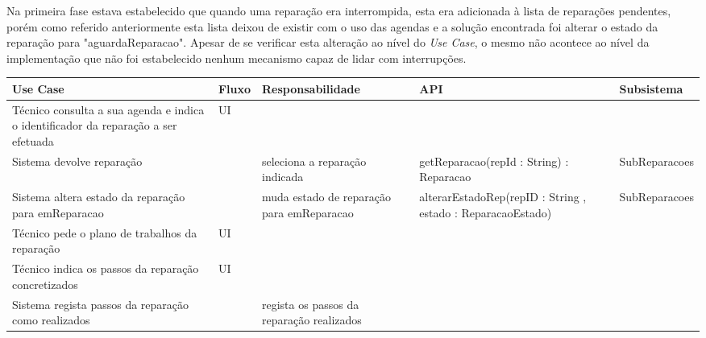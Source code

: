 \documentclass[../relatorio.tex]{subfiles}
\begin{document}
Na primeira fase estava estabelecido que quando uma reparação era interrompida, esta era adicionada à lista de reparações pendentes, porém como
referido anteriormente esta lista deixou de existir com o uso das agendas e a solução encontrada foi alterar o estado da reparação para "aguardaReparacao".
Apesar de se verificar esta alteração ao nível do \textit{Use Case}, o mesmo não acontece ao nível da implementação que não foi estabelecido nenhum
mecanismo capaz de lidar com interrupções.

\begin{landscape}
    \begin{table}[!h]
        \centering
        \begin{tabular}{|p{5cm}|p{1cm}|p{4cm}|p{6cm}|p{3cm}|}
            \hline
            \rowcolor{gray!20!white}
            Use Case & Fluxo                                            & Responsabilidade & API & Subsistema \\
            \hline
            \rowcolor{yellow}
            Técnico consulta a sua agenda e indica o identificador da reparação a ser efetuada
                     & UI
                     & 
                     & 
                     & 
            \\
            \hline
            Sistema devolve reparação
                     & 
                     & seleciona a reparação indicada
                     & getReparacao(repId : String) : Reparacao
                     & SubReparacoes
            \\
            \hline
            Sistema altera estado da reparação para emReparacao
                     & 
                     & muda estado de reparação para emReparacao
                     & alterarEstadoRep(repID : String , estado : ReparacaoEstado)
                     & SubReparacoes
            \\
            \hline
            \rowcolor{yellow}
            Técnico pede o plano de trabalhos da reparação
                     & UI
                     & 
                     & 
                     & 
            \\
            \hline
            \rowcolor{yellow}
            Técnico indica os passos da reparação concretizados
                     & UI
                     & 
                     & 
                     & 
            \\
            \hline
            Sistema regista passos da reparação como realizados
                     & 
                     & regista os passos da reparação realizados 

\end{tabular}
\end{table}
\end{landscape}
\end{document}
